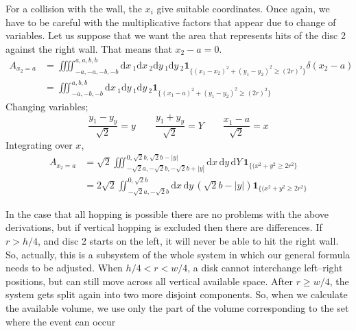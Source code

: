 \documentclass[superscriptaddress,pre,reprint,showpacs,twocolumn]{revtex4-1}
\newcommand{\rd}[1]{\mathrm{d}{#1} \,}
\newcommand{\indicatorsymbol}{\mathbf{1}}
\newcommand{\indicator}[1]{\indicatorsymbol_{ \{   #1 \} } }
\begin{document}
    For a collision with the wall, the $x_i$ give suitable coordinates. Once again, we
    have to be careful with the multiplicative factors that appear due to change
    of variables. Let us suppose that we want the area that represents hits of
    the disc 2 against the right wall. That means that $x_2-a=0$. 
    \begin{align}
      A_{x_2=a} & =\iiiint_{-a,-a,-b,-b}^{a,a,b,b} \rd x_1 \rd x_2 \rd y_1 \rd y_2 
      \indicator{(x_1-x_2)^2+(y_1-y_2)^2 \geq (2 r)^2} \delta (x_2-a)\\
      &=\iiint_{-a,-b,-b}^{a,b,b} \rd x_1  \rd y_1 \rd y_2 
      \indicator{(x_1-a)^2+(y_1-y_2)^2 \geq (2 r)^2} 
    \end{align}
    Changing variables;
    \begin{equation}
      \frac{y_1-y_y}{\sqrt{2}} =  y  \qquad \frac{y_1+y_y}{\sqrt{2}}=Y \qquad \frac{x_1-a}{\sqrt{2}}=x
    \end{equation}
    Integrating over $x$,
    \begin{align}\label{areachoquexy}
      A_{x_2=a} & =\sqrt{2}\iiint_{-\sqrt{2}a,-\sqrt{2}b,-\sqrt{2}b+|y]}^{0,\sqrt{2}b,\sqrt{2}b-|y|}
        \rd x \rd y \rd Y 
      \indicator{(x^2+y^2 \geq 2 r^2} \\
      &=2\sqrt{2}\iint_{-\sqrt{2}a,-\sqrt{2}b}^{0,\sqrt{2}b}
        \rd x \rd y (\sqrt{2} b - |y|)
      \indicator{(x^2+y^2 \geq 2 r^2}
    \end{align}
    
    
    In the case that all hopping is possible there are no problems with the above derivations,
    but if vertical hopping is excluded then there are differences.
 If $r>h/4$, and disc 2 starts
    on the left, it will never be able to hit the right wall. So, actually, this
    is a subsystem of the whole  system in which our general formula needs
    to be adjusted. 
    When $h/4<r<w/4$, a disk cannot interchange left--right positions,
    but can still move across all vertical available space.  After $r\geq w/4$,
    the system gets split again into two more disjoint components.
    So, when we calculate the available volume, we use only the
    part of the volume corresponding to the set where the event can occur
    
\end{document}
